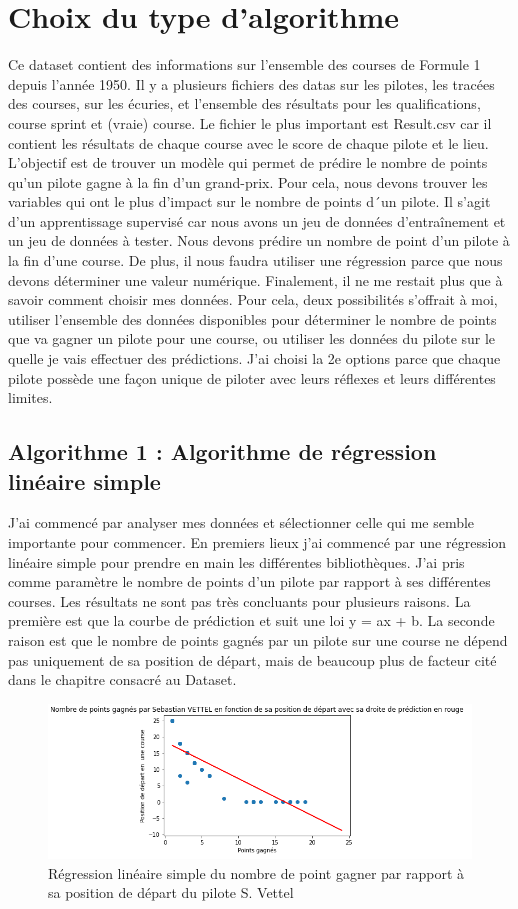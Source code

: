 \chapter{Choix du type d'algorithme}
Ce dataset contient des informations sur l'ensemble des courses de Formule 1 depuis l'année 1950. Il y a plusieurs fichiers des datas sur les pilotes, les tracées des courses, sur les écuries, et l'ensemble des résultats pour les qualifications, course sprint et (vraie) course. Le fichier le plus important est Result.csv car il contient les résultats de chaque course avec le score de chaque pilote et le lieu. L'objectif est de trouver un modèle qui permet de prédire le nombre de points qu'un pilote gagne à la fin d'un grand-prix. Pour cela, nous devons trouver les variables qui ont le plus d'impact sur le nombre de points d´un pilote. Il s'agit d'un apprentissage supervisé car nous avons un jeu de données d'entraînement et un jeu de données à tester. Nous devons prédire un nombre de point d'un pilote à la fin d'une course. De plus, il nous faudra utiliser une régression parce que nous devons déterminer une valeur numérique. Finalement, il ne me restait plus que à savoir comment choisir mes données. Pour cela, deux possibilités s'offrait à moi, utiliser l'ensemble des données disponibles pour déterminer le nombre de points que va gagner un pilote pour une course, ou utiliser les données du pilote sur le quelle je vais effectuer des prédictions. J'ai choisi la 2e options parce que chaque pilote possède une façon unique de piloter avec leurs réflexes et leurs différentes limites.


\section{Algorithme 1 : Algorithme de régression linéaire simple}
J'ai commencé par analyser mes données et sélectionner celle qui me semble importante pour commencer. En premiers lieux j'ai commencé par une régression linéaire simple pour prendre en main les différentes bibliothèques. J'ai pris comme paramètre le nombre de points d'un pilote par rapport à ses différentes courses. Les résultats ne sont pas très concluants pour plusieurs raisons. La première est que la courbe de prédiction et suit une loi y = ax + b. La seconde raison est que le nombre de points gagnés par un pilote sur une course ne dépend pas uniquement de sa position de départ, mais de beaucoup plus de facteur cité dans le chapitre consacré au Dataset.

\begin{figure}[H]
    \centering
    \includegraphics[width=.8\textwidth]{images/RegVettel.png} 
    \caption{Régression linéaire simple du nombre de point gagner par rapport à sa position de départ du pilote S. Vettel}
\end{figure}

